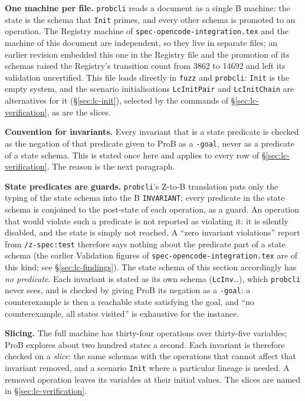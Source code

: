 \documentclass[a4paper,10pt,fleqn]{article}
\newcommand{\field}[1]{\texttt{#1}}
\begin{document}
\textbf{One machine per file.} \texttt{probcli} reads a \fuzz{} document
as a single B machine: the state is the schema that \field{Init} primes,
and every other schema is promoted to an operation. The Registry machine
of \texttt{spec-opencode-integration.tex} and the machine of this document
are independent, so they live in separate files; an earlier revision
embedded this one in the Registry file and the promotion of its schemas
raised the Registry's transition count from 3862 to 14692 and left its
validation uncertified. This file loads directly in \texttt{fuzz} and
\texttt{probcli}: \field{Init} is the empty system, and the scenario
initialisations \field{LcInitPair} and \field{LcInitChain} are alternatives
for it (\S\ref{sec:lc-init}), selected by the commands of
\S\ref{sec:lc-verification}, as are the slices.

\textbf{Convention for invariants.} Every invariant that is a state
predicate is checked as the negation of that predicate given to ProB as a
\texttt{-goal}, never as a predicate of a state schema. This is stated once
here and applies to every row of \S\ref{sec:lc-verification}. The reason
is the next paragraph.

\textbf{State predicates are guards.} \texttt{probcli}'s Z-to-B
translation puts only the typing of the state schema into the B
\texttt{INVARIANT}; every predicate in the state schema is conjoined to
the post-state of each operation, as a guard. An operation that would
violate such a predicate is not reported as violating it: it is
silently disabled, and the state is simply not reached. A ``zero
invariant violations'' report from \texttt{/z-spec:test} therefore says
nothing about the predicate part of a state schema (the earlier
Validation figures of \texttt{spec-opencode-integration.tex} are of this
kind; see \S\ref{sec:lc-findings}). The state schema of this section accordingly has
\emph{no predicate}. Each invariant is stated as its own schema
(\field{LcInv}\ldots), which \texttt{probcli} never sees, and is checked by
giving ProB its negation as a \texttt{-goal}: a counterexample is then a
reachable state satisfying the goal, and ``no counterexample, all states
visited'' is exhaustive for the instance.

\textbf{Slicing.} The full machine has thirty-four operations over
thirty-five variables; ProB explores about two hundred states a second.
Each invariant is therefore checked on a \emph{slice}: the same schemas
with the operations that cannot affect that invariant removed, and a
scenario \field{Init} where a particular lineage is needed. A removed
operation leaves its variables at their initial values. The slices are
named in \S\ref{sec:lc-verification}.
\end{document}
